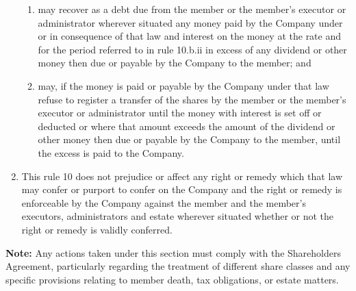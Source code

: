 \begin{enumerate}[label=(\alph*)]
\begin{enumerate}[label=(\roman*)]
        \item may recover as a debt due from the member or the member's executor or administrator wherever situated any money paid by the Company under or in consequence of that law and interest on the money at the rate and for the period referred to in rule 10.b.ii in excess of any dividend or other money then due or payable by the Company to the member; and
        
        \item may, if the money is paid or payable by the Company under that law refuse to register a transfer of the shares by the member or the member's executor or administrator until the money with interest is set off or deducted or where that amount exceeds the amount of the dividend or other money then due or payable by the Company to the member, until the excess is paid to the Company.
    \end{enumerate}
    
    \item This rule 10 does not prejudice or affect any right or remedy which that law may confer or purport to confer on the Company and the right or remedy is enforceable by the Company against the member and the member's executors, administrators and estate wherever situated whether or not the right or remedy is validly conferred.
\end{enumerate}

\textbf{Note:} Any actions taken under this section must comply with the Shareholders Agreement, particularly regarding the treatment of different share classes and any specific provisions relating to member death, tax obligations, or estate matters. 
